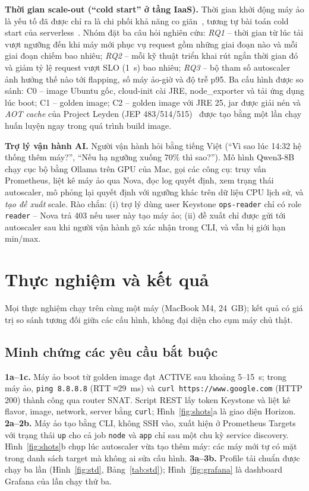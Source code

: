 \documentclass[runningheads]{llncs}
\newcommand{\code}[1]{\texttt{#1}}
\begin{document}
\textbf{Thời gian scale-out (``cold start'' ở tầng IaaS).} Thời gian khởi động máy ảo là yếu tố đã được chỉ ra là chi phối khả năng co giãn~\cite{mao}, tương tự bài toán cold start của serverless~\cite{serverless}. Nhóm đặt ba câu hỏi nghiên cứu: \emph{RQ1} – thời gian từ lúc tải vượt ngưỡng đến khi máy mới phục vụ request gồm những giai đoạn nào và mỗi giai đoạn chiếm bao nhiêu; \emph{RQ2} – mỗi kỹ thuật triển khai rút ngắn thời gian đó và giảm tỷ lệ request vượt SLO (1~s) bao nhiêu; \emph{RQ3} – bộ tham số autoscaler ảnh hưởng thế nào tới flapping, số máy ảo-giờ và độ trễ p95. Ba cấu hình được so sánh: C0 – image Ubuntu gốc, cloud-init cài JRE, node\_exporter và tải ứng dụng lúc boot; C1 – golden image; C2 – golden image với JRE 25, jar được giải nén và \emph{AOT cache} của Project Leyden (JEP 483/514/515)~\cite{leyden} được tạo bằng một lần chạy huấn luyện ngay trong quá trình build image.

\textbf{Trợ lý vận hành AI.} Người vận hành hỏi bằng tiếng Việt (``Vì sao lúc 14:32 hệ thống thêm máy?'', ``Nếu hạ ngưỡng xuống 70\% thì sao?''). Mô hình Qwen3-8B chạy cục bộ bằng Ollama trên GPU của Mac, gọi các công cụ: truy vấn Prometheus, liệt kê máy ảo qua Nova, đọc log quyết định, xem trạng thái autoscaler, mô phỏng lại quyết định với ngưỡng khác trên dữ liệu CPU lịch sử, và \emph{tạo đề xuất} scale. Rào chắn: (i) trợ lý dùng user Keystone \code{ops-reader} chỉ có role \code{reader} – Nova trả 403 nếu user này tạo máy ảo; (ii) đề xuất chỉ được gửi tới autoscaler sau khi người vận hành gõ xác nhận trong CLI, và vẫn bị giới hạn min/max.

\section{Thực nghiệm và kết quả}

Mọi thực nghiệm chạy trên cùng một máy (MacBook M4, 24~GB); kết quả có giá trị so sánh tương đối giữa các cấu hình, không đại diện cho cụm máy chủ thật.

\subsection{Minh chứng các yêu cầu bắt buộc}

\textbf{1a–1c.} Máy ảo boot từ golden image đạt ACTIVE sau khoảng 5–15~s; trong máy ảo, \code{ping 8.8.8.8} (RTT ≈29~ms) và \code{curl https://www.google.com} (HTTP 200) thành công qua router SNAT. Script REST lấy token Keystone và liệt kê flavor, image, network, server bằng \code{curl}; Hình~\ref{fig:shots}a là giao diện Horizon. \textbf{2a–2b.} Máy ảo tạo bằng CLI, không SSH vào, xuất hiện ở Prometheus Targets với trạng thái \code{up} cho cả job \code{node} và \code{app} chỉ sau một chu kỳ service discovery. Hình~\ref{fig:shots}b chụp lúc autoscaler vừa tạo thêm máy: các máy mới tự có mặt trong danh sách target mà không ai sửa cấu hình. \textbf{3a–3b.} Profile tải chuẩn được chạy ba lần (Hình~\ref{fig:std}, Bảng~\ref{tab:std}); Hình~\ref{fig:grafana} là dashboard Grafana của lần chạy thứ ba.
\end{document}
